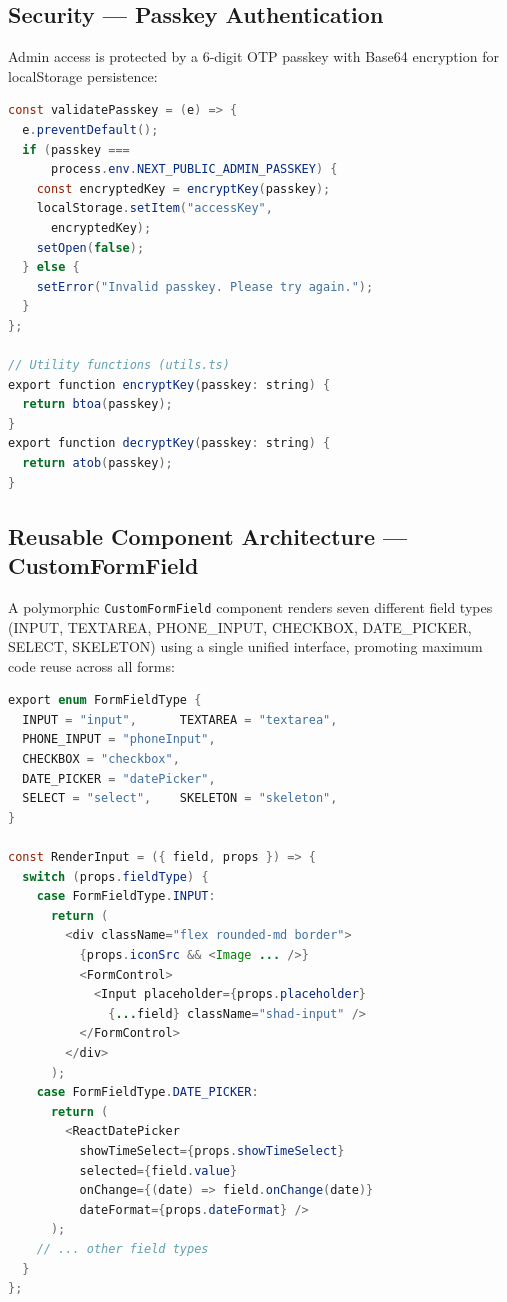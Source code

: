 \documentclass[11pt,a4paper]{article}
\begin{document}
\subsection{Security --- Passkey Authentication}

Admin access is protected by a 6-digit OTP passkey with Base64 encryption for localStorage persistence:

\begin{lstlisting}[language=Java, caption={Passkey Validation and Encryption}]
const validatePasskey = (e) => {
  e.preventDefault();
  if (passkey ===
      process.env.NEXT_PUBLIC_ADMIN_PASSKEY) {
    const encryptedKey = encryptKey(passkey);
    localStorage.setItem("accessKey",
      encryptedKey);
    setOpen(false);
  } else {
    setError("Invalid passkey. Please try again.");
  }
};

// Utility functions (utils.ts)
export function encryptKey(passkey: string) {
  return btoa(passkey);
}
export function decryptKey(passkey: string) {
  return atob(passkey);
}
\end{lstlisting}

\subsection{Reusable Component Architecture --- CustomFormField}

A polymorphic \texttt{CustomFormField} component renders seven different field types (INPUT, TEXTAREA, PHONE\_INPUT, CHECKBOX, DATE\_PICKER, SELECT, SKELETON) using a single unified interface, promoting maximum code reuse across all forms:

\begin{lstlisting}[language=Java, caption={Polymorphic Form Field Component}]
export enum FormFieldType {
  INPUT = "input",      TEXTAREA = "textarea",
  PHONE_INPUT = "phoneInput",
  CHECKBOX = "checkbox",
  DATE_PICKER = "datePicker",
  SELECT = "select",    SKELETON = "skeleton",
}

const RenderInput = ({ field, props }) => {
  switch (props.fieldType) {
    case FormFieldType.INPUT:
      return (
        <div className="flex rounded-md border">
          {props.iconSrc && <Image ... />}
          <FormControl>
            <Input placeholder={props.placeholder}
              {...field} className="shad-input" />
          </FormControl>
        </div>
      );
    case FormFieldType.DATE_PICKER:
      return (
        <ReactDatePicker
          showTimeSelect={props.showTimeSelect}
          selected={field.value}
          onChange={(date) => field.onChange(date)}
          dateFormat={props.dateFormat} />
      );
    // ... other field types
  }
};
\end{lstlisting}
\end{document}

